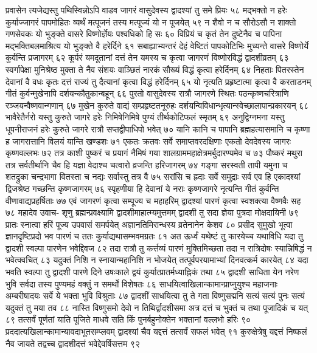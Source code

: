 प्रवासेन त्यजेद्यस्तु पथिस्विन्नोऽपि वाडव 
जागरं वासुदेवस्य द्वादश्यां तु समे प्रियः ५८
मद्भक्तो न हरेः कुर्याज्जागरं पापमोहितः 
व्यर्थं मत्पूजनं तस्य मत्पूज्यं यो न पूजयेत् ५९
न शैवो न च सौरोऽसौ न शाक्तो गणसेवकः 
यो भुङ्क्ते वासरे विष्णोर्ज्ञेयः पश्वधिको हि सः ६०
विप्रियं च कृतं तेन दुष्टेनैव च पापिना 
मद्भक्तिबलमाश्रित्य यो भुङ्क्ते वै हरेर्दिने ६१
सबाह्याभ्यन्तरं देहं वेष्टितं पापकोटिभिः 
मुच्यन्ते वासरे विष्णोर्ये कुर्वन्ति प्रजागरम् ६२
कूर्परं यमदूतानां दत्तं तेन यमस्य च 
कृत्वा जागरणं विष्णोरविद्धं द्वादशीव्रतम् ६३
स्वर्गापेक्षा मुनिश्रेष्ठ मुक्ता ते नैव संशयः 
वाञ्छितं नारकं सौख्यं विद्धं कृत्वा हरेर्दिनम् ६४
निहताः पितरस्तेन देवानां वै वधः कृतः 
दत्तं राज्यं तु दैत्यानां कृत्वा विद्धं हरेर्दिनम् ६५
यो नृत्यति प्रहृष्टात्मा कृत्वा वै करताडनम् 
गीतं कुर्वन्मुखेनापि दर्शयन्कौतुकान्बहून् ६६
पुरतो वासुदेवस्य रात्रौ जागरणे स्थितः 
पठन्कृष्णचरित्राणि रञ्जयन्वैष्णवान्गणान् ६७
मुखेन कुरुते वाद्यं सम्प्रहृष्टतनूरुहः 
दर्शयन्विविधान्भृत्यान्स्वेच्छालापान्प्रकारयन् ६८
भावैरेतैर्नरो यस्तु कुरुते जागरे हरेः 
निमिषेनिमिषे पुण्यं तीर्थकोटिफलं स्मृतम् ६९
अनुद्विग्नमना यस्तु धूपनीराजनं हरेः 
कुरुते जागरे रात्रौ सप्तद्वीपाधिपो भवेत् ७०
यानि कानि च पापानि ब्रह्महत्यासमानि च 
कृष्णा ह जागरात्तानि विलयं यान्ति खण्डशः ७१
एकतः क्रतवः सर्वे समाप्तवरदक्षिणाः 
एकतो देवदेवस्य जागरः कृष्णवल्लभः ७२
तत्र काशी पुष्करं च प्रयागं नैमिषं गया 
शालग्राममहाक्षेत्रमर्बुदारण्यमेव च ७३
पौष्करं मथुरा तत्र सर्वतीर्थानि चैव हि 
यज्ञा वेदाश्च चत्वारो व्रजन्ति हरिजागरम् ७४
गङ्गा सरस्वती तापी यमुना च शतद्रुका 
चन्द्रभागा वितस्ता च नद्यः सर्वास्तु तत्र वै ७५
सरांसि च ह्रदाः सर्वे समुद्राः सर्व एव हि 
एकादश्यां द्विजश्रेष्ठ गच्छन्ति कृष्णजागरम् ७६
स्पृहणीया हि देवानां ये नराः कृष्णजागरे 
नृत्यन्ति गीतं कुर्वन्ति वीणावाद्यप्रहर्षिताः ७७
एवं जागरणं कृत्वा सम्पूज्य च महाहरिम् 
द्वादश्यां पारणं कृत्वा स्वशक्त्या वैष्णवैः सह ७८
महादेव उवाच-
शृणु ब्रह्मन्प्रवक्ष्यामि द्वादशीमाहात्म्यमुत्तमम् 
द्वादशी तु सदा ज्ञेया पुत्रदा मोक्षदायिनी ७९
प्रातः स्नात्वा हरिं पूज्य उपवासं समर्पयेत् 
अज्ञानतिमिरान्धस्य व्रतेनानेन केशव ८०
प्रसीद सुमुखो भूत्वा ज्ञानदृष्टिप्रदो भव 
पारणं च ततः कुर्याद्यथासम्भवमग्रतः ८१
अत ऊर्ध्वं यथेष्टं तु कारयेच्च यथाविधि 
यदा तु द्वादशी स्वल्पा पारणेन भवेद्दिवज ८२
तदा रात्रौ तु कर्त्तव्यं पारणं मुक्तिमिच्छता 
तदा न रात्रिदोषः स्यान्निषिद्धं न भवेत्क्वचित् ८३
यदुक्तं निशि न स्नायान्महानिशि न भोजयेत् 
तत्पूर्वपरयामाभ्यां दिनवत्कर्म कारयेत् ८४
यदा भवति स्वल्पा तु द्वादशी पारणे दिने 
उषःकाले  द्वयं कुर्यात्प्रातर्मध्याह्निकं तथा ८५
द्वादशी साधिता येन नरेण भुवि सर्वदा 
तस्य पुण्यमहं वक्तुं न समर्थो विशेषतः ८६
साधयित्वाखिलान्कामान्प्राप्नुयुश्च महाजनाः 
अम्बरीषादयः सर्वे ये भक्ता भुवि विश्रुताः ८७
द्वादशीं साधयित्वा तु ते गता विष्णुसद्मनि 
सत्यं सत्यं पुनः सत्यं यदुक्तं तु मया तव ८८
नास्ति विष्णुसमो देवो न तिथिर्द्वादशीसमा 
अत्र दत्तं च भुक्तं च तथा पूजादिकं च यत् ८९
तत्सर्वं पूर्णतां याति पूजिते माधवे सति 
किं पुनर्बहुनोक्तेन भक्तानां वल्लभो हरिः ९०
प्रददात्यखिलान्कामान्यावदाभूतसम्प्लवम् 
द्वादश्यां चैव यद्दत्तं तत्सर्वं सफलं भवेत् ९१
कुरुक्षेत्रेषु यद्दत्तं निष्फलं नैव जायते 
तद्वच्च द्वादशीदत्तं भवेद्देवर्षिसत्तम ९२

